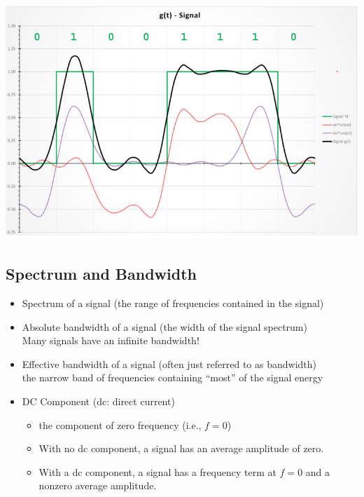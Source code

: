 \documentclass[11pt]{article}
\begin{document}
\includegraphics[width=\textwidth]{fourier-analysis-12.png}

\subsection{Spectrum and Bandwidth}
\begin{itemize}
    \item Spectrum of a signal (the range of frequencies contained in the signal)
    \item Absolute bandwidth of a signal (the width of the signal spectrum) \\
    Many signals have an infinite bandwidth!
    \item Effective bandwidth of a signal (often just referred to as bandwidth) \\
    the narrow band of frequencies containing “most” of the signal energy
    \item DC Component (dc: direct current)
    \begin{itemize}
        \item the component of zero frequency (i.e., \(f = 0\))
        \item With no dc component, a signal has an average amplitude of zero.
        \item With a dc component, a signal has a frequency term at \(f = 0\) and a nonzero average amplitude.
    \end{itemize}
\end{itemize}
\end{document}
